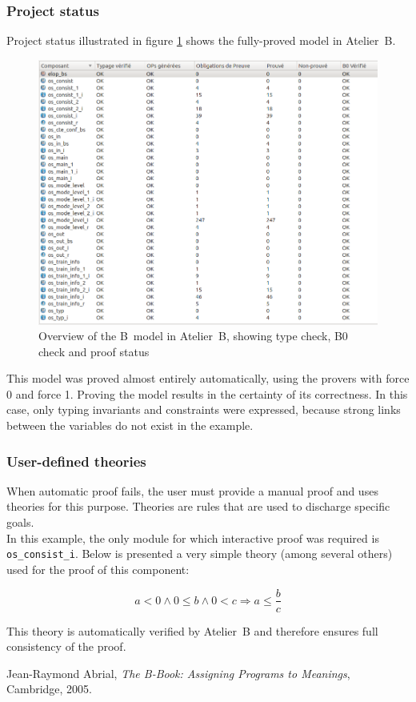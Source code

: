 \documentclass{article}
\begin{document}
\subsubsection{Project status}
Project status illustrated in figure \ref{fig:atelierb} shows the fully-proved model in Atelier~B.

\begin{figure}[h!]
\centering
\includegraphics[width=1\textwidth]{atelierb}
\caption{Overview of the B~model in Atelier~B, showing type check, B0 check and proof status}
\label{fig:atelierb}
\end{figure}

This model was proved almost entirely automatically, using the provers with force 0 and force 1. Proving the model results in the certainty of its correctness. In this case, only typing invariants and constraints were expressed, because strong links between the variables do not exist in the example.

\subsubsection{User-defined theories}
When automatic proof fails, the user must provide a manual proof and uses theories for this purpose. Theories are rules that are used to discharge specific goals.\\
In this example, the only module for which interactive proof was required is \verb+os_consist_i+. Below is presented a very simple theory (among several others) used for the proof of this component:

\begin{equation}
\tag{User theory 1}
a < 0 \land 0 \leq b \land 0 < c \Rightarrow a \leq \frac{b}{c}
\end{equation}

This theory is automatically verified by Atelier~B and therefore ensures full consistency of the proof.

\newpage

\begin{thebibliography}{9}
	Jean-Raymond Abrial,
	{\itshape The B-Book: Assigning Programs to Meanings},
	Cambridge,
	2005.
\end{thebibliography}
\end{document}
